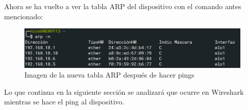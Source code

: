  \noindent Ahora se ha vuelto a ver la tabla ARP del dispositivo con el comando antes mencionado:
 
 \newpage
 
\begin{figure}[!ht]
	\centering
	\includegraphics[scale=0.4]{images/arp_2.png}
	\caption{Imagen de la nueva tabla ARP después de hacer pings}
	\label{fig:arp2}
\end{figure}

\noindent Lo que continua en la siguiente sección se analizará que ocurre en Wireshark mientras se hace el ping al dispositivo.
